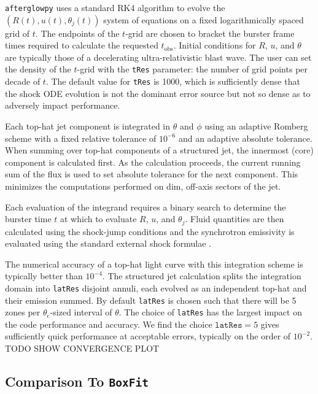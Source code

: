 \documentclass[twocolumn]{aastex62}
\newcommand{\afterglowpy}{{\tt afterglowpy}}
\newcommand{\boxfit}{{\tt BoxFit}}
\newcommand{\tobs}{\ensuremath{t_{\mathrm{obs}}}}
\newcommand{\thC}{\ensuremath{\theta_{\mathrm{c}}}}
\begin{document}
\afterglowpy{} uses a standard RK4 algorithm to evolve the $(R(t), u(t), \theta_j(t))$ system of equations on a fixed logarithmically spaced grid of $t$.  The endpoints of the $t$-grid are chosen to bracket the burster frame times required to calculate the requested $\tobs$.  Initial conditions for $R$, $u$, and $\theta$ are typically those of a decelerating ultra-relativistic blast wave.  The user can set the density of the $t$-grid with the {\tt tRes} parameter: the number of grid points per decade of $t$.  The default value for {\tt tRes} is 1000, which is sufficiently dense that the shock ODE evolution is not the dominant error source but not so dense as to adversely impact performance.

Each top-hat jet component is integrated in $\theta$ and $\phi$ using an adaptive Romberg scheme with a fixed relative tolerance of $10^{-6}$ and an adaptive absolute tolerance.  When summing over top-hat components of a structured jet, the innermost (core) component is calculated first.  As the calculation proceeds, the current running sum of the flux is used to set absolute tolerance for the next component.  This minimizes the computations performed on dim, off-axis sectors of the jet.  

Each evaluation of the integrand requires a binary search to determine the burster time $t$ at which to evaluate $R$, $u$, and $\theta_j$.  Fluid quantities are then calculated using the shock-jump conditions and the synchrotron emissivity is evaluated using the standard external shock formulae \citep{Granot:2002aa,van-Eerten:2010aa}.  

The numerical accuracy of a top-hat light curve with this integration scheme is typically better than $10^{-4}$.  The structured jet calculation splits the integration domain into {\tt latRes} disjoint annuli, each evolved as an independent top-hat and their emission summed.  By default {\tt latRes} is chosen such that there will be 5 zones per $\thC$-sized interval of $\theta$.   The choice of  {\tt latRes} has the largest impact on the code performance and accuracy.  We find the choice $\mathtt{latRes} = 5$ gives sufficiently quick performance at acceptable errors, typically on the order of $10^{-2}$.  TODO SHOW CONVERGENCE PLOT


\subsection{Comparison To \boxfit{}} \label{subsec:boxfitcomp}
\end{document}
